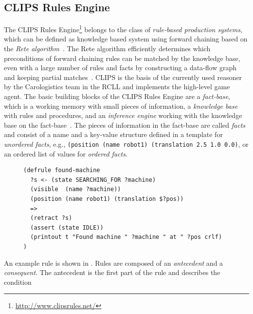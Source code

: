 \subsection{CLIPS Rules Engine}
The CLIPS Rules Engine\footnote{\url{http://www.clipsrules.net/}} belongs to the class of \emph{rule-based
  production systems}, which can be defined as knowledge based system
using forward chaining based on the \emph{Rete
  algorithm}~\cite{aimodern}. The Rete algorithm efficiently determines
which preconditions of forward chaining rules can be matched by the
knowledge base, even with a large number of rules and facts by
constructing a data-flow graph and keeping partial
matches~\cite{Rete}. CLIPS is the basis of the currently used reasoner
by the Carologistics team in the RCLL and implements the high-level
game agent. The basic building blocks of the CLIPS Rules Engine are a
\emph{fact-base}, which is a working memory with small pieces of
information, a \emph{knowledge base} with rules and procedures, and an
\emph{inference engine} working with the knowledge base on the
fact-base~\cite{CLIPS-RM}. The pieces of information in the fact-base
are called \emph{facts} and consist of a name and a key-value
structure defined in a template for \emph{unordered facts},
e.g., \texttt{(position~(name~robot1)~(translation~2.5~1.0~0.0)}, or an
ordered list of values for \emph{ordered facts}.
\begin{figure}
\begin{lstlisting}[showlines,style=ReallySmallCLIPS, caption={CLIPS
    rule to change a robots state when the object it searched for is visible.},
  label=lst:clips-rule,
  emph={skill, args, state, target, res},
  emphstyle=\bfseries\color{green!80!black},
  emph={[2]\?skill, \$\?args, wait-for-lock, \?target, use,
  WAIT-FOR-LOCK, SKILL-EXECUTION, running},
  emphstyle={[2]\bfseries\color{blue!80!black}},
  morekeywords={retract, assert, modify, skill-call, skill-to-execute,
  wait-for-lock}]
(defrule found-machine
  ?s <- (state SEARCHING_FOR ?machine)
  (visible  (name ?machine))
  (position (name robot1) (translation $?pos))
  =>  
  (retract ?s) 
  (assert (state IDLE))
  (printout t "Found machine " ?machine " at " ?pos crlf)
)
\end{lstlisting} %
\end{figure}
An example rule is shown in . Rules are
composed of an \emph{antecedent} and a \emph{consequent}. The
antecedent is the first part of the rule and describes the condition

